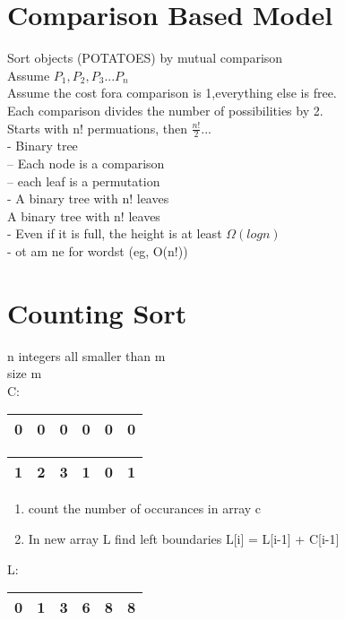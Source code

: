 \documentclass[12pt]{article}
\begin{document}
	\section*{Comparison Based Model}
	Sort objects (POTATOES) by mutual comparison\\
	
	Assume $P_1, P_2, P_3 ... P_n$\\
	Assume the cost fora comparison is 1,everything else is free.\\
	
	Each comparison divides the number of possibilities by 2.\\
	Starts with n! permuations, then $\frac{n!}{2} ...$\\
	- Binary tree\\
	-- Each node is a comparison\\
	-- each leaf is a permutation\\
	- A binary tree with n! leaves\\
	
	A binary tree with n! leaves\\
	- Even if it is full, the height is at least $\Omega(logn)$\\
	- ot am ne for wordst (eg, O(n!))\\
	
	\section*{Counting Sort}
	n integers all smaller than m\\
	size m\\
	C:\\
	\begin{tabular}{| c | c | c | c | c | c |}
		\hline
		0 & 0 & 0 & 0 & 0 & 0 \\ \hline	
	\end{tabular}
	\begin{tabular}{| c | c | c | c | c | c |}
		\hline
		1 & 2 & 3 & 1 & 0 & 1 \\ \hline	
	\end{tabular}
	
	\begin{enumerate}
		\item count the number of occurances in array c
		\item In new array L find left boundaries L[i] = L[i-1] + C[i-1]
	\end{enumerate}
	
	L:
	\begin{tabular}{| c | c | c | c | c | c |}
		\hline
		0 & 1 & 3 & 6 & 8 & 8 \\ \hline	
	\end{tabular}
	
\end{document}
